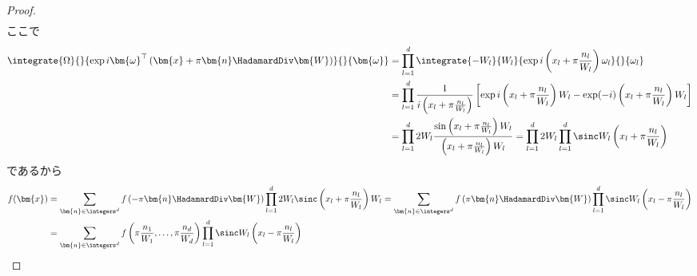 \begin{proof}
\begin{align*}
        \end{align*}
        ここで
        \begin{align*}
            \integrate{\Omega}{}{\exp i \bm{\omega}^\top\left(\bm{x} + \pi\bm{n}\HadamardDiv\bm{W}\right) }{}{\bm{\omega}} &= \prod_{l=1}^d \integrate{-W_l}{W_l}{\exp i\left(x_l + \pi\frac{n_l}{W_l}\right)\omega_l}{}{\omega_l} \\
            &= \prod_{l=1}^d \frac{1}{i\left(x_l + \pi\frac{n_l}{W_l}\right)}\left[\exp i\left(x_l + \pi\frac{n_l}{W_l}\right)W_l - \exp (-i)\left(x_l + \pi\frac{n_l}{W_l}\right)W_l\right] \\
            &= \prod_{l=1}^d 2W_l \frac{\sin \left(x_l + \pi\frac{n_l}{W_l}\right)W_l}{\left(x_l + \pi\frac{n_l}{W_l}\right)W_l} = \prod_{l=1}^d 2W_l \prod_{l=1}^d \sinc W_l\left(x_l + \pi\frac{n_l}{W_l}\right)
        \end{align*}
        であるから
        \begin{align*}
            f(\bm{x}) &= \sum_{\bm{n}\in\integers^d} f\left(-\pi\bm{n}\HadamardDiv\bm{W}\right) \prod_{l=1}^d 2W_l \sinc \left(x_l + \pi\frac{n_l}{W_l}\right)W_l = \sum_{\bm{n}\in\integers^d} f\left(\pi\bm{n}\HadamardDiv\bm{W}\right) \prod_{l=1}^d \sinc W_l\left(x_l - \pi\frac{n_l}{W_l}\right) \\
            &= \sum_{\bm{n}\in\integers^d} f\left(\pi\frac{n_1}{W_1},\dots,\pi\frac{n_d}{W_d}\right) \prod_{l=1}^d \sinc W_l\left(x_l - \pi\frac{n_l}{W_l}\right)
        \end{align*}
    \end{proof}